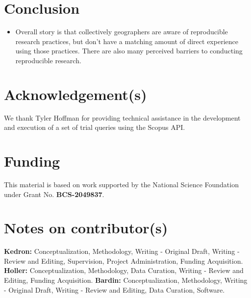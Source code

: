 \documentclass[]{interact}
\theoremstyle{plain}%
\theoremstyle{definition}
\theoremstyle{remark}
\begin{document}
\section*{Conclusion}

\begin{itemize}
    \item Overall story is that collectively geographers are aware of reproducible research practices, but don't have a matching amount of direct experience using those practices. There are also many perceived barriers to conducting reproducible research.
\end{itemize}

\theendnotes


\section*{Acknowledgement(s)}
We thank Tyler Hoffman for providing technical assistance in the development and execution of a set of trial queries using the Scopus API.

\section*{Funding}
This material is based on work supported by the National Science Foundation under Grant No. \textbf{BCS-2049837}.

\section*{Notes on contributor(s)}
\textbf{Kedron:} Conceptualization, Methodology, Writing - Original Draft, Writing - Review and Editing, Supervision, Project Administration, Funding Acquisition. \textbf{Holler:} Conceptualization, Methodology, Data Curation, Writing - Review and Editing, Funding Acquisition. \textbf{Bardin:} Conceptualization, Methodology, Writing - Original Draft, Writing - Review and Editing, Data Curation, Software.
\end{document}
